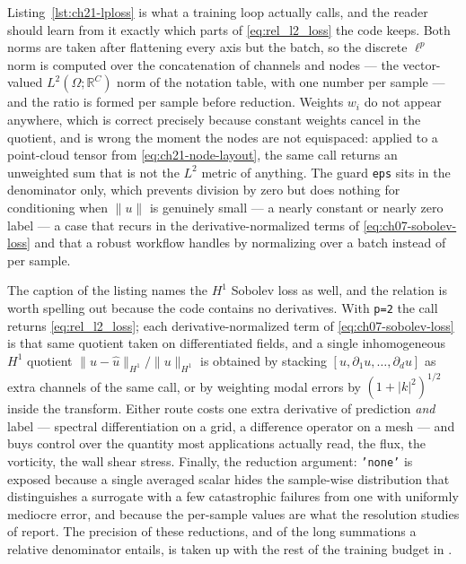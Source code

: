 Listing~\ref{lst:ch21-lploss} is what a training loop actually calls, and the reader
should learn from it exactly which parts of \eqref{eq:rel_l2_loss} the code keeps. Both
norms are taken after flattening every axis but the batch, so the discrete $\ell^p$ norm
is computed over the concatenation of channels and nodes --- the vector-valued
$L^2(\Omega; \mathbb{R}^{C})$ norm of the notation table, with one number per sample --- and
the ratio is formed per sample before reduction. Weights $w_i$ do not appear anywhere,
which is correct precisely because constant weights cancel in the quotient, and is wrong
the moment the nodes are not equispaced: applied to a point-cloud tensor from
\eqref{eq:ch21-node-layout}, the same call returns an unweighted sum that is not the
$L^2$ metric of anything. The guard \texttt{eps} sits in the denominator only, which
prevents division by zero but does nothing for conditioning when $\|u\|$ is genuinely
small --- a nearly constant or nearly zero label --- a case that recurs in the
derivative-normalized terms of \eqref{eq:ch07-sobolev-loss} and that a robust workflow
handles by normalizing over a batch instead of per sample.

The caption of the listing names the $H^1$ Sobolev loss as well, and the relation is
worth spelling out because the code contains no derivatives. With \texttt{p=2} the call
returns \eqref{eq:rel_l2_loss}; each derivative-normalized term of
\eqref{eq:ch07-sobolev-loss} is that same quotient taken on differentiated fields, and a
single inhomogeneous $H^1$ quotient
$\|u - \hat{u}\|_{H^1}/\|u\|_{H^1}$ is obtained by stacking $[u, \partial_1 u, \dots,
\partial_d u]$ as extra channels of the same call, or by weighting modal errors by
$(1 + |k|^2)^{1/2}$ inside the transform. Either route
costs one extra derivative of prediction \emph{and} label --- spectral differentiation on a
grid, a difference operator on a mesh --- and buys control over the quantity most
applications actually read, the flux, the vorticity, the wall shear stress. 
Finally, the reduction argument: \texttt{'none'} is exposed because a single averaged
scalar hides the sample-wise distribution that distinguishes a surrogate with a few
catastrophic failures from one with uniformly mediocre error, and because the
per-sample values are what the resolution studies of
 report. The precision of
these reductions, and of the long summations a relative denominator entails, is taken up
with the rest of the training budget in
.

